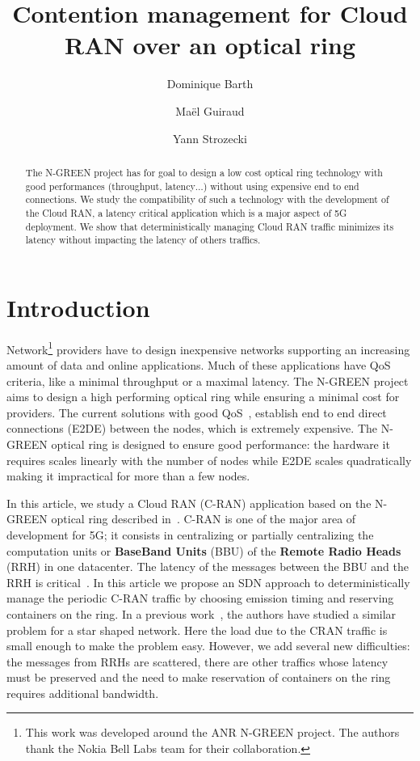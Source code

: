 \documentclass[]{llncs}
\title{Contention management for Cloud RAN over an optical ring}
\author{Dominique Barth \inst{1}
  \and Ma\"el Guiraud \inst{1}
   \and Yann Strozecki \inst{1}
  }
\institute{David Laboratory, UVSQ}
\begin{document}
\maketitle


\begin{abstract}
The N-GREEN project has for goal to design a low cost optical ring technology with good performances (throughput, latency$\dots$) without using expensive end to end connections. We study the compatibility of such a technology with the development of the Cloud RAN, a latency critical application which is a major aspect of 5G deployment. We show that deterministically managing Cloud RAN traffic minimizes its latency without impacting the latency of others traffics. 
\end{abstract}


\section{Introduction}

Network\footnote{This work was developed around the ANR N-GREEN project. The authors thank the Nokia Bell Labs team for their collaboration.} providers have to design inexpensive networks supporting an increasing amount of data and online applications. Much of these applications have QoS criteria, like a minimal throughput or a maximal latency. The N-GREEN project aims to design a high performing optical ring while ensuring a minimal cost for providers. The current solutions with good QoS~\cite{pizzinat2015things,tayq2017real}, establish end to end direct connections (E2DE) between the nodes, which is extremely expensive. The N-GREEN optical ring is designed to ensure good performance: the hardware it requires scales linearly with the number of nodes while E2DE scales quadratically making it impractical for more than a few nodes.

In this article, we study a Cloud RAN (C-RAN) application based on the N-GREEN optical ring described in~\cite{ngreenarchitecture,uscumlicscalable}. C-RAN is one of the major area of development for 5G; it consists in centralizing or partially centralizing the computation units or {\bf BaseBand Units} (BBU) of the {\bf Remote Radio Heads} (RRH) in one datacenter. The latency of the messages between the BBU and the RRH is critical~\cite{3gpp5g}. In this article we propose an SDN approach to deterministically manage the periodic C-RAN traffic by choosing emission timing and reserving containers on the ring. In a previous work~\cite{dominique2018deterministic}, the authors have studied a similar problem for a star shaped network. Here the load due to the CRAN traffic is small enough to make the problem easy. However, we add several new difficulties: the messages from RRHs are scattered, there are other traffics whose latency must be preserved and the need to make reservation of containers on the ring requires additional bandwidth.
\end{document}

